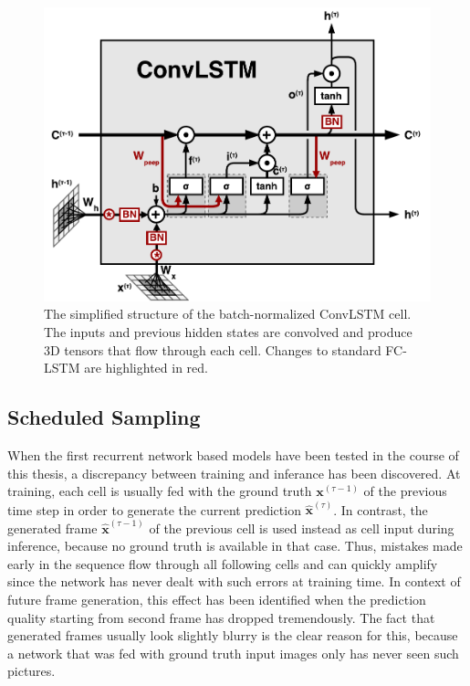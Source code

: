 \begin{figure}[htpb]
	\centering
	\includegraphics[width=0.7\linewidth]{figures/convlstm.pdf} 
	\caption[ConvLSTM Cell]{The simplified structure of the batch-normalized ConvLSTM cell. The inputs and previous hidden states are convolved and produce 3D tensors that flow through each cell. Changes to standard FC-LSTM are highlighted in red.} \label{fig:convlstm-cell}
\end{figure}


\subsection{Scheduled Sampling} \label{sec:sched_sample}


When the first recurrent network based models have been tested in the course of this thesis, a discrepancy between training and inferance has been discovered. At training, each cell is usually fed with the ground truth $\textbf{x}^{(\tau-1)}$ of the previous time step in order to generate the current prediction $\hat{\textbf{x}}^{(\tau)}$. In contrast, the generated frame $ \hat{\textbf{x}}^{(\tau-1)}$ of the previous cell is used instead as cell input during inference, because no ground truth is available in that case. Thus, mistakes made early in the sequence flow through all following cells and can quickly amplify since the network has never dealt with such errors at training time. In context of future frame generation, this effect has been identified when the prediction quality starting from second frame has dropped tremendously. The fact that generated frames usually look slightly blurry is the clear reason for this, because a network that was fed with ground truth input images only has never seen such pictures.

